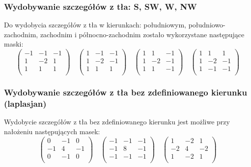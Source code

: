 \documentclass{classrep}
\begin{document}
\subsubsection{Wydobywanie szczegółów z tła: S, SW, W, NW}
Do wydobycia szczegółów z tła w kierunkach: południowym, południowo-zachodnim, zachodnim i północno-zachodnim zostało wykorzystane następujące maski:
\[
 \begin{pmatrix}
  -1 & -1 & -1 \\
  1 & -2 & 1 \\
  1 & 1 & 1 \\
 \end{pmatrix}
\quad
 \begin{pmatrix}
  1 & -1 & -1 \\
  1 & -2 & -1 \\
  1 & 1 & 1 \\
 \end{pmatrix}
\quad
 \begin{pmatrix}
  1 & 1 & -1 \\
  1 & -2 & -1 \\
  1 & 1 & -1 \\
 \end{pmatrix}
\quad
 \begin{pmatrix}
  1 & 1 & 1 \\
  1 & -2 & -1 \\
  1 & -1 & -1 \\
 \end{pmatrix}
\]

\subsubsection{Wydobywanie szczegółów z tła bez zdefiniowanego kierunku (laplasjan)}
Wydobycie szczegółów z tła bez zdefiniowanego kierunku jest możliwe przy nałożeniu następujących masek:
\[
 \begin{pmatrix}
  0 & -1 & 0 \\
  -1 & 4 & -1 \\
  0 & -1 & 0 \\
 \end{pmatrix}
\quad
 \begin{pmatrix}
  -1 & -1 & -1 \\
  -1 & 8 & -1 \\
  -1 & -1 & -1 \\
 \end{pmatrix}
\quad
 \begin{pmatrix}
  1 & -2 & 1 \\
  -2 & 4 & -2 \\
  1 & -2 & 1 \\
 \end{pmatrix}
\]
\end{document}
